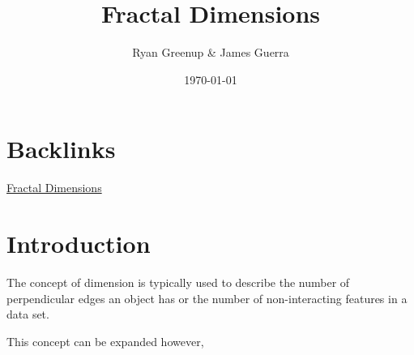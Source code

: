 \documentclass[11pt]{article}
\author{Ryan Greenup \& James Guerra}
\date{\today}
\title{Fractal Dimensions}
\begin{document}
\maketitle
\tableofcontents


\section{Backlinks}
\label{sec:org337658a}
\href{../../README.org}{Fractal Dimensions}

\section{Introduction}
\label{sec:org0844f86}
The concept of dimension is typically used to describe the number of
perpendicular edges an object has or the number of non-interacting features in a
data set.

This concept can be expanded however,

\begin{center}

\end{center}
\end{document}
